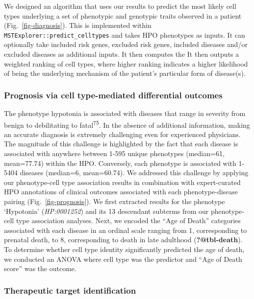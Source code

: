 \documentclass[
sn-nature
]{sn-jnl}
\begin{document}
We designed an algorithm that uses our results to predict the most
likely cell types underlying a set of phenotypic and genotypic traits
observed in a patient (Fig.~\ref{fig-diagnosis}). This is implemented
within \texttt{MSTExplorer::predict\_celltypes} and takes HPO phenotypes
as inputs. It can optionally take included risk genes, excluded risk
genes, included diseases and/or excluded diseases as additional inputs.
It then computes the It then outputs a weighted ranking of cell types,
where higher ranking indicates a higher likelihood of being the
underlying mechanism of the patient's particular form of disease(s).

\subsubsection{Prognosis via cell type-mediated differential
outcomes}\label{prognosis-via-cell-type-mediated-differential-outcomes-1}

The phenotype hypotonia is associated with diseases that range in
severity from benign to debilitating to fatal\textsuperscript{75}. In
the absence of additional information, making an accurate diagnosis is
extremely challenging even for experienced physicians. The magnitude of
this challenge is highlighted by the fact that each disease is
associated with anywhere between 1-595 unique phenotypes (median=61,
mean=77.74) within the HPO. Conversely, each phenotype is associated
with 1-5404 diseases (median=6, mean=60.74). We addressed this challenge
by applying our phenotype-cell type association results in combination
with expert-curated HPO annotations of clinical outcomes associated with
each phenotype-disease pairing (Fig.~\ref{fig-prognosis}). We first
extracted results for the phenotype `Hypotonia' (\emph{HP:0001252}) and
its 13 descendant subterms from our phenotype-cell type association
analyses. Next, we encoded the ``Age of Death'' categories associated
with each disease in an ordinal scale ranging from 1, corresponding to
prenatal death, to 8, corresponding to death in late adulthood
(\textbf{?@tbl-death}). To determine whether cell type identity
significantly predicted the age of death, we conducted an ANOVA where
cell type was the predictor and ``Age of Death score'' was the outcome.

\subsubsection{Therapeutic target
identification}\label{therapeutic-target-identification-1}
\end{document}

